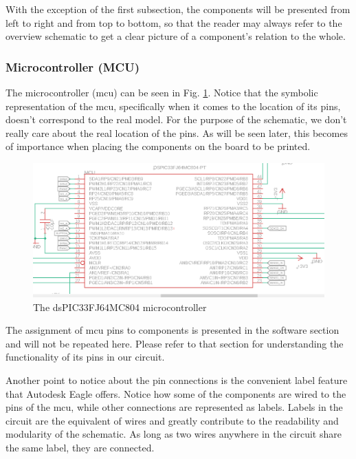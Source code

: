 With the exception of the first subsection, the components will be presented from left to right and from top to bottom, so that the reader may always refer to the overview schematic to get a clear picture of a component's relation to the whole.

\FloatBarrier
\vspace{1cm}

\subsubsection{Microcontroller (MCU)}

The microcontroller (mcu) can be seen in Fig. \ref{fig:mcuL}.
Notice that the symbolic representation of the mcu, specifically when it comes to the location of its pins, doesn't correspond to the real model. For the purpose of the schematic, we don't really care about the real location of the pins. As will be seen later, this becomes of importance when placing the components on the board to be printed.

\begin{figure}[htb]
    \centering
    \includegraphics[width=1\textwidth]{figures/hardware/MCU.PNG}
    \caption{The dsPIC33FJ64MC804 microcontroller}
    \label{fig:mcuL}
\end{figure}

\FloatBarrier

\noindent
The assignment of mcu pins to components is presented in the software section and will not be repeated here. Please refer to that section for understanding the functionality of its pins in our circuit.

Another point to notice about the pin connections is the convenient label feature that Autodesk Eagle offers. Notice how some of the components are wired to the pins of the mcu, while other connections are represented as labels. Labels in the circuit are the equivalent of wires and greatly contribute to the readability and modularity of the schematic. As long as two wires anywhere in the circuit share the same label, they are connected.

